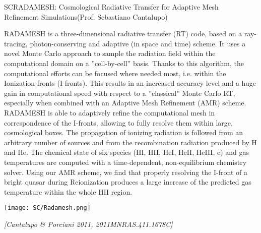 \begin{section}{SC}{RADAMESH: Cosmological Radiative Transfer for Adaptive Mesh\\
    \hspace*{4cm} Refinement Simulations}{(Prof. Sebastiano Cantalupo)}
  \begin{minipage}[l]{\textwidth}

    {\small RADAMESH is a three-dimensional radiative transfer (RT) code, based
      on a ray-tracing, photon-conserving and adaptive (in space and time)
      scheme. It uses a novel Monte Carlo approach to sample the radiation field
      within the computational domain on a ”cell-by-cell” basis. Thanks to this
      algorithm, the computational efforts can be focused where needed most,
      i.e. within the Ionization-fronts (I-fronts). This results in an increased
      accuracy level and a huge gain in computational speed with respect to a
      ”classical” Monte Carlo RT, especially when combined with an Adaptive Mesh
      Refinement (AMR) scheme. RADAMESH is able to adaptively refine the
      computational mesh in correspondence of the I-fronts, allowing to fully
      resolve them within large, cosmological boxes. The propagation of ionizing
      radiation is followed from an arbitrary number of sources and from the
      recombination radiation produced by H and He. The chemical state of six
      species (HI, HII, HeI, HeII, HeIII, e) and gas temperatures are computed
      with a time-dependent, non-equilibrium chemistry solver. Using our AMR
      scheme, we find that properly resolving the I-front of a bright quasar
      during Reionization produces a large increase of the predicted gas
      temperature within the whole HII region.}
  \end{minipage}

  \vspace{0.5cm}

  \begin{minipage}{\linewidth}
    \begin{center}
      \texttt{[image: SC/Radamesh.png]}
    \end{center}
  \end{minipage}

  \vspace{0.5cm}

  {\footnotesize \textit{[Cantalupo \& Porciani 2011, 2011MNRAS.411.1678C]}}
\end{section}